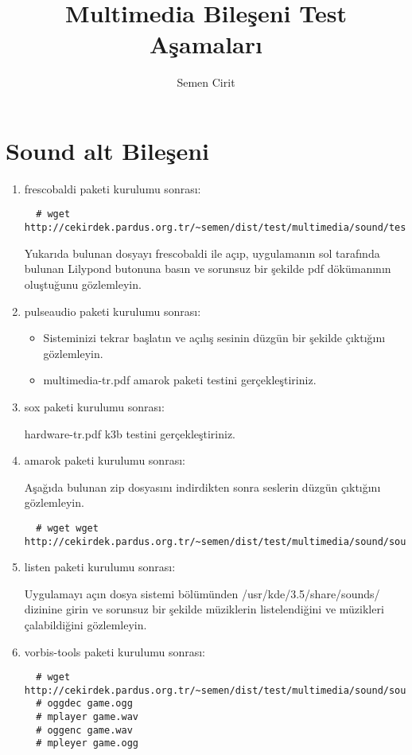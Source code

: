 \documentclass[a4paper,10pt]{article}
\title{Multimedia Bileşeni Test Aşamaları}
\author{Semen Cirit}
\begin{document}
\maketitle

\section{Sound alt Bileşeni}
\begin{enumerate}
\item frescobaldi paketi kurulumu sonrası:
 \begin{verbatim}
  # wget http://cekirdek.pardus.org.tr/~semen/dist/test/multimedia/sound/test_frescobaldi.ly
 \end{verbatim}
Yukarıda bulunan dosyayı frescobaldi ile açıp, uygulamanın sol tarafında bulunan Lilypond butonuna basın ve sorunsuz bir şekilde pdf dökümanının oluştuğunu gözlemleyin.
\item pulseaudio paketi kurulumu sonrası:
\begin{itemize}
 \item Sisteminizi tekrar başlatın ve açılış sesinin düzgün bir şekilde çıktığını gözlemleyin. 
 \item multimedia-tr.pdf amarok paketi testini gerçekleştiriniz.
\end{itemize}
\item sox paketi kurulumu sonrası:

hardware-tr.pdf k3b testini gerçekleştiriniz.
\item amarok paketi kurulumu sonrası:
 
Aşağıda bulunan zip dosyasını indirdikten sonra seslerin düzgün çıktığını gözlemleyin.
 \begin{verbatim}
  # wget wget http://cekirdek.pardus.org.tr/~semen/dist/test/multimedia/sound/sound.tar
 \end{verbatim}

\item listen paketi kurulumu sonrası: 

Uygulamayı açın dosya sistemi bölümünden /usr/kde/3.5/share/sounds/ dizinine girin ve sorunsuz bir şekilde müziklerin listelendiğini ve müzikleri çalabildiğini gözlemleyin.

\item vorbis-tools paketi kurulumu sonrası: 
 \begin{verbatim}
  # wget http://cekirdek.pardus.org.tr/~semen/dist/test/multimedia/sound/sound/game.ogg
  # oggdec game.ogg
  # mplayer game.wav
  # oggenc game.wav
  # mpleyer game.ogg
 \end{verbatim}


\end{enumerate}
\end{document}
